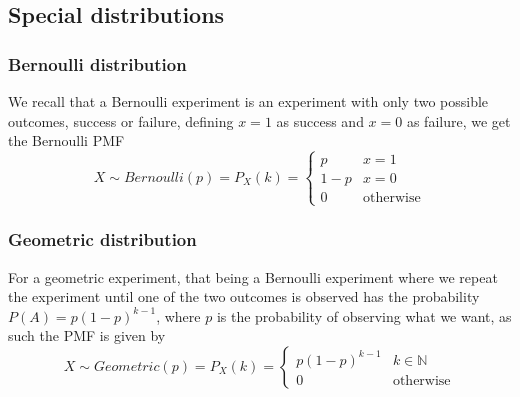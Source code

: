 \subsection{Special distributions}
\subsubsection{Bernoulli distribution}
We recall that a Bernoulli experiment is an experiment with only two possible outcomes, success or failure, defining $x=1$ as success and $x=0$ as failure, we get the Bernoulli PMF
\[
    X\sim Bernoulli(p)=P_{X}(k)=\begin{cases}p & x=1 \\ 1-p & x=0 \\ 0 & \text{otherwise}\end{cases}
\]
\subsubsection{Geometric distribution}
For a geometric experiment, that being a Bernoulli experiment where we repeat the experiment until one of the two outcomes is observed has the probability $P(A)=p(1-p)^{k-1}$, where $p$ is the probability of observing what we want, as such the PMF is given by
\[
    X\sim Geometric(p)=P_{X}(k)=\begin{cases}p(1-p)^{k-1} & k\in \mathbb{N} \\ 0 & \text{otherwise}\end{cases}
\]
